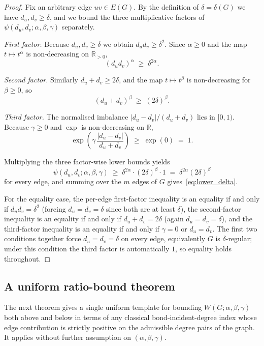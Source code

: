 \documentclass[a5paper, 10pt]{article}
\theoremstyle{plain}
\theoremstyle{remark}
\theoremstyle{definition}
\newcommand{\Wuzi}{W(G;\alpha,\beta,\gamma)}
\begin{document}
\begin{proof}
Fix an arbitrary edge $uv \in E(G)$. By the definition of
$\delta = \delta(G)$ we have $d_u, d_v \ge \delta$, and we bound
the three multiplicative factors of
$\psi(d_u, d_v; \alpha, \beta, \gamma)$ separately.

\emph{First factor.} Because $d_u, d_v \ge \delta$ we obtain
$d_u d_v \ge \delta^{2}$. Since $\alpha \ge 0$ and the map
$t \mapsto t^{\alpha}$ is non-decreasing on $\mathbb{R}_{> 0}$,
\[
(d_u d_v)^{\alpha} \;\ge\; \delta^{2\alpha}.
\]

\emph{Second factor.} Similarly $d_u + d_v \ge 2\delta$, and the
map $t \mapsto t^{\beta}$ is non-decreasing for $\beta \ge 0$, so
\[
(d_u + d_v)^{\beta} \;\ge\; (2\delta)^{\beta}.
\]

\emph{Third factor.} The normalised imbalance
$|d_u - d_v|/(d_u + d_v)$ lies in $[0, 1)$. Because $\gamma \ge 0$
and $\exp$ is non-decreasing on $\mathbb{R}$,
\[
\exp\!\left(\gamma\,\frac{|d_u - d_v|}{d_u + d_v}\right)
\;\ge\;
\exp(0) \;=\; 1.
\]

Multiplying the three factor-wise lower bounds yields
\[
\psi(d_u, d_v; \alpha, \beta, \gamma)
\;\ge\; \delta^{2\alpha} \cdot (2\delta)^{\beta} \cdot 1
\;=\; \delta^{2\alpha}(2\delta)^{\beta}
\]
for every edge, and summing over the $m$ edges of $G$
gives~\eqref{eq:lower_delta}.

For the equality case, the per-edge first-factor inequality is
an equality if and only if $d_u d_v = \delta^{2}$ (forcing
$d_u = d_v = \delta$ since both are at least $\delta$), the
second-factor inequality is an equality if and only if
$d_u + d_v = 2\delta$ (again $d_u = d_v = \delta$), and the
third-factor inequality is an equality if and only if $\gamma = 0$
or $d_u = d_v$. The first two conditions together force
$d_u = d_v = \delta$ on every edge, equivalently $G$ is
$\delta$-regular; under this condition the third factor is
automatically $1$, so equality holds throughout.
\end{proof}

\subsection{A uniform ratio-bound theorem}\label{sub:ratio}

The next theorem gives a single uniform template for bounding
$\Wuzi$ both above and below in terms of any classical
bond-incident-degree index whose edge contribution is strictly
positive on the admissible degree pairs of the graph. It applies
without further assumption on $(\alpha, \beta, \gamma)$.
\end{document}
